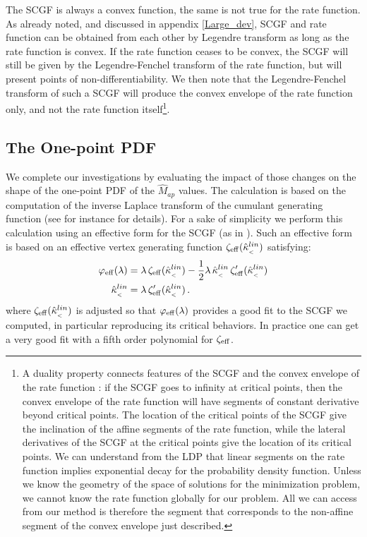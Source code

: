 \documentclass[twocolumn,aps,reprint, nofootinbib]{revtex4}
\newcommand{\eff}{{\rm eff}}
\newcommand{\hkappa}{\hat{\kappa}_{_<}}
\newcommand{\Map}{\hat{M}_{ap}}
\begin{document}
The SCGF is always a convex function, the same is not true for the rate function. As already noted, and discussed in appendix \ref{Large_dev}, SCGF and rate function can be obtained from each other by Legendre transform as long as the rate function is convex. If the rate function ceases to be convex, the SCGF will still be given by the Legendre-Fenchel transform of the rate function, but will present points of non-differentiability. We then note that the Legendre-Fenchel transform of such a SCGF will produce the convex envelope of the rate function only, and not the rate function itself\footnote{A duality property connects features of the SCGF and the convex envelope of the rate function \cite{2009PhR...478....1T}: if the SCGF goes to infinity at critical points, then the convex envelope of the rate function will have segments of constant derivative beyond critical points. The location of the critical points of the SCGF give the inclination of the affine segments of the rate function, while the lateral derivatives of the SCGF at the critical points give the location of its critical points. We can understand from the LDP that linear segments on the rate function implies exponential decay for the probability density function. 
Unless we know the geometry of the space of solutions for the minimization problem, we cannot know the rate function globally for our problem. All we can access from our method is therefore the segment that corresponds to the non-affine segment of the convex envelope just described.}. 



\subsection{The One-point PDF}

We complete our investigations by evaluating the impact of those changes on the shape of the one-point PDF of the
$\Map$ values. The calculation is based on the computation of the inverse Laplace transform of the cumulant generating function (see for instance \cite{bernardeau2014statistics} for details). For a sake of simplicity we perform this calculation using an effective form for the SCGF (as in \cite{bernardeau2000construction}). 
Such an effective form is based on an effective vertex generating function $\zeta_{\eff}(\hkappa^{lin})$ satisfying:
\begin{subequations} 
\label{phi_eff_sist}
\begin{align}
\varphi_{\eff}(\lambda) & =  \lambda \, \zeta_{\eff}(\hkappa^{lin}) - \frac{1}{2} \lambda \,  \hkappa^{lin} \, \zeta_{\eff}'(\hkappa^{lin}) \label{phi_eff_sist_a}\\
\hkappa^{lin}&  =  \lambda \, \zeta_{\eff}'(\hkappa^{lin}) \label{phi_eff_sist_b} \, .
\end{align}
\end{subequations}
where $\zeta_{\eff}(\hkappa^{lin})$ is adjusted so that $\varphi_{\eff}(\lambda) $ provides a good fit to the SCGF we computed, in particular reproducing its critical behaviors. In practice one can get a very good fit with a fifth order polynomial for $\zeta_{\eff}$.
\end{document}
